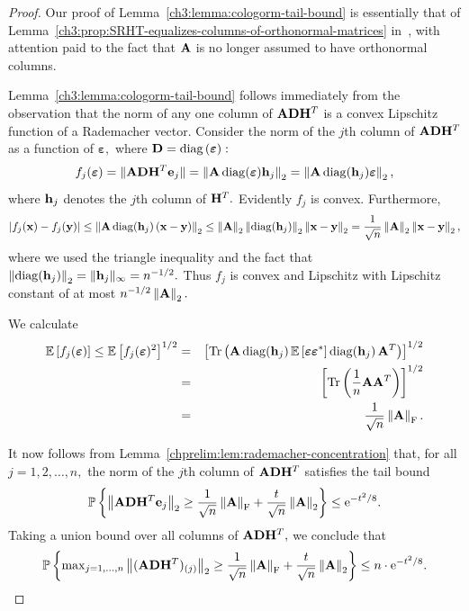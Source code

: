 \begin{proof}
Our proof of Lemma~\ref{ch3:lemma:cologorm-tail-bound} is essentially that of 
Lemma~\ref{ch3:prop:SRHT-equalizes-columns-of-orthonormal-matrices} 
in~\cite{Tro11}, with attention paid to the fact that $\mathbf{A}$ is no longer 
assumed to have orthonormal columns. 

Lemma~\ref{ch3:lemma:cologorm-tail-bound} follows immediately from the 
observation that the norm of any one column of $\mathbf{A} \mathbf{D} \mathbf{H} ^T$ is
a convex Lipschitz function of a Rademacher vector.
Consider the norm of the $j$th column of $\mathbf{A} \mathbf{D} \mathbf{H} ^T$ as a 
function of $\boldsymbol{\varepsilon},$ where $\mathbf{D} = \mbox{}{\textrm{diag}}\left(\boldsymbol{\varepsilon}\right):$
\[
 f_j(\boldsymbol{\varepsilon}) = \|\mathbf{A} \mathbf{D} \mathbf{H} ^T \boldsymbol{\mathrm{e}}_j\| = 
 \left\|\mathbf{A}\, \mathrm{diag}(\boldsymbol{\varepsilon}) {\mathbf h}_j\right\|_2 = 
 \left\|\mathbf{A}\, \mathrm{diag}({\mathbf h}_j) \boldsymbol{\varepsilon}\right\|_2,
\]
where ${\mathbf h}_j$ denotes the $j$th column of $\mathbf{H} ^T.$
Evidently $f_j$ is convex. Furthermore,
\[
 |f_j({\mathbf x}) - f_j({\mathbf y})| \leq \left\|\mathbf{A}\,\mathrm{diag}({\mathbf h}_j)\, ({\mathbf x} - {\mathbf y})\right\|_2 \leq 
 \left\|\mathbf{A}\right\|_2 \left\|\mathrm{diag}({\mathbf h}_j)\right\|_2 \left\|{\mathbf x} - {\mathbf y}\right\|_2 = 
 \frac{1}{\sqrt{n}} \left\|\mathbf{A}\right\|_2 \left\|{\mathbf x} - {\mathbf y}\right\|_2,
\]
where we used the triangle inequality and the fact that 
$\left\|\mathrm{diag}({\mathbf h}_j)\right\|_2 = \mbox{}\|{\mathbf h}_j\|_\infty = n^{-1/2}.$ Thus $f_j$ is 
convex and Lipschitz with Lipschitz constant of at most $n^{-1/2} \left\|\mathbf{A}\right\|_2.$

We calculate
\begin{eqnarray*}
 \mbox{}{\mathbb{E}}\left[f_j(\boldsymbol{\varepsilon})\right] \leq \mbox{}{\mathbb{E}}\left[ f_j(\boldsymbol{\varepsilon})^2\right]^{1/2}
 &=& \left[ \mbox{}{\mathrm{Tr}}\left(\mathbf{A}\, \mathrm{diag}({\mathbf h}_j)\, 
   \mbox{}{\mathbb{E}}\left[\boldsymbol{\varepsilon} \boldsymbol{\varepsilon}^*\right] \mathrm{diag}({\mathbf h}_j)\,
   \mathbf{A} ^T\right) \right]^{1/2}\\
 &=& \left[\mbox{}{\mathrm{Tr}}\left(\frac{1}{n} \mathbf{A}\mathbf{A} ^T\right) \right]^{1/2} \\
 &=& \frac{1}{\sqrt{n}} \left\|\mathbf{A}\right\|_\mathrm{F}.
\end{eqnarray*}

It now follows from Lemma~\ref{chprelim:lem:rademacher-concentration} that, for 
all $j=1,2,\ldots,n,$ the norm of the $j$th column of 
$\mathbf{A} \mathbf{D} \mathbf{H} ^T$ satisfies the tail bound
\[
 \mathbb{P}\left\{ \left\|\mathbf{A} \mathbf{D} \mathbf{H} ^T \boldsymbol{\mathrm{e}}_j\right\|_2 \geq \frac{1}{\sqrt{n}} 
 \left\|\mathbf{A}\right\|_\mathrm{F} + \frac{t}{\sqrt{n}} \left\|\mathbf{A}\right\|_2 \right\} \leq \mathrm{e}^{-t^2/8}.
\]
Taking a union bound over all columns of $\mathbf{A}\mathbf{D}\mathbf{H} ^T,$ we 
conclude that
\[
 \mathbb{P}\left\{ \max\nolimits_{j=1,\ldots,n} 
 \left\|(\mathbf{A} \mathbf{D} \mathbf{H} ^T)_{(j)}\right\|_2 \geq \frac{1}{\sqrt{n}} 
 \left\|\mathbf{A}\right\|_\mathrm{F} + \frac{t}{\sqrt{n}} \left\|\mathbf{A}\right\|_2 \right\} \leq n \cdot \mathrm{e}^{-t^2/8}.
\]
\end{proof}

